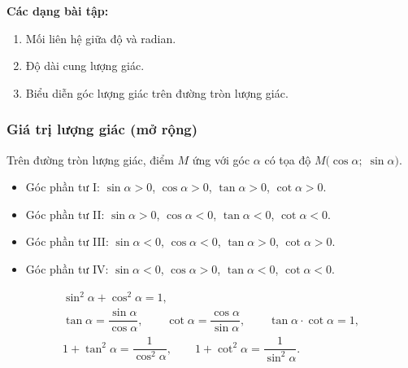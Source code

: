 \documentclass[12pt,a4paper]{article}
\begin{document}
\medskip\noindent\textbf{Các dạng bài tập:}
\begin{enumerate}[label=\textbf{Dạng \arabic*:}, leftmargin=*, align=left]
  \item Mối liên hệ giữa độ và radian.
  \item Độ dài cung lượng giác.
  \item Biểu diễn góc lượng giác trên đường tròn lượng giác.
\end{enumerate}

\subsubsection{Giá trị lượng giác (mở rộng)}

\begin{dinhnghia}
  Trên đường tròn lượng giác, điểm $M$ ứng với góc $\alpha$ có tọa độ
  $M\bigl(\cos\alpha;\;\sin\alpha\bigr)$.
\end{dinhnghia}

\begin{tinhchat}[title={Dấu của giá trị lượng giác theo góc phần tư}]
  \begin{itemize}
    \item Góc phần tư I: $\sin\alpha > 0$, \;$\cos\alpha > 0$, \;$\tan\alpha > 0$, \;$\cot\alpha > 0$.
    \item Góc phần tư II: $\sin\alpha > 0$, \;$\cos\alpha < 0$, \;$\tan\alpha < 0$, \;$\cot\alpha < 0$.
    \item Góc phần tư III: $\sin\alpha < 0$, \;$\cos\alpha < 0$, \;$\tan\alpha > 0$, \;$\cot\alpha > 0$.
    \item Góc phần tư IV: $\sin\alpha < 0$, \;$\cos\alpha > 0$, \;$\tan\alpha < 0$, \;$\cot\alpha < 0$.
  \end{itemize}
\end{tinhchat}

\begin{congthuc}[title={Các hệ thức lượng giác cơ bản}]
  \begin{gather*}
    \sin^2\alpha + \cos^2\alpha = 1, \\[4pt]
    \tan\alpha = \dfrac{\sin\alpha}{\cos\alpha},\qquad
    \cot\alpha = \dfrac{\cos\alpha}{\sin\alpha},\qquad
    \tan\alpha \cdot \cot\alpha = 1, \\[4pt]
    1 + \tan^2\alpha = \dfrac{1}{\cos^2\alpha},\qquad
    1 + \cot^2\alpha = \dfrac{1}{\sin^2\alpha}.
  \end{gather*}
\end{congthuc}
\end{document}
